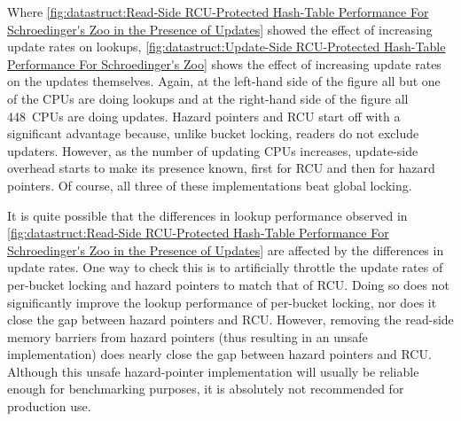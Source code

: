 Where
\cref{fig:datastruct:Read-Side RCU-Protected Hash-Table Performance For Schroedinger's Zoo in the Presence of Updates}
showed the effect of increasing update rates on lookups,
\cref{fig:datastruct:Update-Side RCU-Protected Hash-Table Performance For Schroedinger's Zoo}
shows the effect of increasing update rates on the updates themselves.
Again, at the left-hand side of the figure all but one of the CPUs are
doing lookups and at the right-hand side of the figure all 448~CPUs are
doing updates.
Hazard pointers and RCU start off with a significant advantage because,
unlike bucket locking, readers do not exclude updaters.
However, as the number of updating CPUs increases, update-side overhead
starts to make its presence known, first for RCU and then for hazard
pointers.
Of course, all three of these implementations beat global locking.

It is quite possible that the differences in lookup performance observed in
\cref{fig:datastruct:Read-Side RCU-Protected Hash-Table Performance For Schroedinger's Zoo in the Presence of Updates}
are affected by the differences in update rates.
One way to check this is to artificially throttle the update rates of
per-bucket locking and hazard pointers to match that of RCU\@.
Doing so does not significantly improve the lookup performance of
per-bucket locking, nor does it close the gap between hazard pointers
and RCU\@.
However, removing the read-side memory barriers from hazard pointers
(thus resulting in an unsafe implementation) does nearly close the gap
between hazard pointers and RCU\@.
Although this unsafe hazard-pointer implementation will
usually be reliable enough for benchmarking purposes, it is absolutely
not recommended for production use.

\QuickQuizEnd

